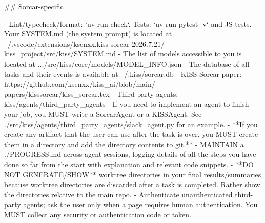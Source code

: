 \documentclass{article}
\begin{document}
\begin{prompt}
## Sorcar-specific

- Lint/typecheck/format: `uv run check`. Tests:
  `uv run pytest -v` and JS tests.
- Your SYSTEM.md (the system prompt) is located at
  ~/.vscode/extensions/ksenxx.kiss-sorcar-2026.7.21/
    kiss_project/src/kiss/SYSTEM.md
- The list of models accessible to you is located at
  .../src/kiss/core/models/MODEL_INFO.json
- The database of all tasks and their events is
  available at ~/.kiss/sorcar.db
- KISS Sorcar paper:
  https://github.com/ksenxx/kiss_ai/blob/main/
    papers/kisssorcar/kiss_sorcar.tex
- Third-party agents: kiss/agents/third_party_agents
- If you need to implement an agent to finish your job,
  you MUST write a SorcarAgent or a KISSAgent. See
  ./src/kiss/agents/third_party_agents/slack_agent.py
  for an example.
- **If you create any artifact that the user can use
  after the task is over, you MUST create them in a
  directory and add the directory contents to git.**
- MAINTAIN a ./PROGRESS.md across agent sessions,
  logging details of all the steps you have done so far
  from the start with explanation and relevant code
  snippets.
- **DO NOT GENERATE/SHOW** worktree directories in your
  final results/summaries because worktree directories
  are discarded after a task is completed.  Rather show
  the directories relative to the main repo.
- Authenticate unauthenticated third-party agents; ask
  the user only when a page requires human
  authentication.  You MUST collect any security or
  authentication code or token.
\end{prompt}
\end{document}
